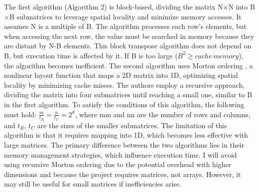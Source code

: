 The first algorithm (Algorithm 2) is block-based, dividing the matrix N$\times$N into B$\times$B submatrices to leverage spatial locality and minimize memory accesses. It assumes N is a multiple of B. The algorithm processes each row's elements, but when accessing the next row, the value must be searched in memory because they are distant by N-B elements. This block transpose algorithm does not depend on B, but execution time is affected by it. If B is too large ($B^2\geq cache\,memory$), the algorithm becomes inefficient.
The second algorithm uses Morton ordering \cite{morton_ordering}, a nonlinear layout function that maps a 2D matrix into 1D, optimizing spatial locality by minimizing cache misses. The authors employ a recursive approach, dividing the matrix into four submatrices until reaching a small one, similar to B in the first algorithm. To satisfy the conditions of this algorithm, the following must hold: $\frac{m}{t_R}=\frac{n}{t_C}=2^d$, where mm and nn are the number of rows and columns, and $t_R$, $t_C$ are the sizes of the smaller submatrices.
The limitation of this algorithm is that it requires mapping into 1D, which becomes less effective with large matrices. The primary difference between the two algorithms lies in their memory management strategies, which influence execution time.
I will avoid using recursive Morton ordering due to the potential overhead with higher dimensions and because the project requires matrices, not arrays. However, it may still be useful for small matrices if inefficiencies arise. %

